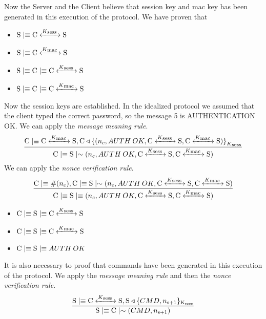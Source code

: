 Now the Server and the Client believe that session key and mac key has been generated in this execution of the protocol. We have proven that
\begin{itemize}
	\item \(\textnormal{S} \mid\equiv \textnormal{C} \xleftrightarrow{K\textsubscript{sess }} \textnormal{S}\)
	\item \(\textnormal{S} \mid\equiv \textnormal{C} \xleftrightarrow{K\textsubscript{mac }} \textnormal{S}\)
	\item \(\textnormal{S} \mid\equiv \textnormal{C} \mid\equiv \textnormal{C} \xleftrightarrow{K\textsubscript{sess }} \textnormal{S}\)
	\item \(\textnormal{S} \mid\equiv \textnormal{C} \mid\equiv \textnormal{C} \xleftrightarrow{K\textsubscript{mac }} \textnormal{S}\)
\end{itemize}
Now the session keys are established. In the idealized protocol we assumed that the client typed the correct password, so the message 5 is AUTHENTICATION OK. We can apply the \textit{message meaning rule}.
\[
	\frac{\textnormal{C} \mid\equiv \textnormal{C} \xleftrightarrow{K\textsubscript{mac }} \textnormal{S}, \textnormal{C} \triangleleft { \{ (n_c,AUTH\:OK,\textnormal{C}\xleftrightarrow{K\textsubscript{sess }}\textnormal{S},\textnormal{C}\xleftrightarrow{K\textsubscript{mac }}\textnormal{S}) \} }_{K\textsubscript{sess}}}
	{\textnormal{C} \mid\equiv \textnormal{S} \mid\sim {(n_c,AUTH\:OK,\textnormal{C}\xleftrightarrow{K\textsubscript{sess }}\textnormal{S},\textnormal{C}\xleftrightarrow{K\textsubscript{mac }}\textnormal{S})}} 
\]
We can apply the \textit{nonce verification rule}.
\[
	\frac{\textnormal{C} \mid\equiv \#(n_c), \textnormal{C} \mid\equiv \textnormal{S} \mid\sim{(n_c,AUTH\:OK,\textnormal{C}\xleftrightarrow{K\textsubscript{sess }}\textnormal{S},\textnormal{C}\xleftrightarrow{K\textsubscript{mac }}\textnormal{S})}}
	{\textnormal{C} \mid\equiv \textnormal{S} \mid\equiv {(n_c,AUTH\:OK,\textnormal{C}\xleftrightarrow{K\textsubscript{sess }}\textnormal{S},\textnormal{C}\xleftrightarrow{K\textsubscript{mac }}\textnormal{S})}} 
\]
\begin{itemize}
	\item \(\textnormal{C} \mid\equiv \textnormal{S} \mid\equiv \textnormal{C} \xleftrightarrow{K\textsubscript{sess }} \textnormal{S}\)
	\item \(\textnormal{C} \mid\equiv \textnormal{S} \mid\equiv \textnormal{C} \xleftrightarrow{K\textsubscript{mac }} \textnormal{S}\)
	\item \(\textnormal{C} \mid\equiv \textnormal{S}\mid\equiv AUTH\:OK\)
\end{itemize}
It is also necessary to proof that commands have been generated in this execution of the protocol. We apply the \textit{message meaning rule} and then the \textit{nonce verification rule}.
\[ \frac{\textnormal{S} \mid\equiv \textnormal{C} \xleftrightarrow{K\textsubscript{sess }} \textnormal{S}, \textnormal{S} \triangleleft \lbrace CMD, n\textsubscript{s+1} \rbrace \textsubscript{K\textsubscript{sess}} }{ \textnormal{S} \mid\equiv \textnormal{C} \mid\sim (CMD,n\textsubscript{s+1}) }\]


